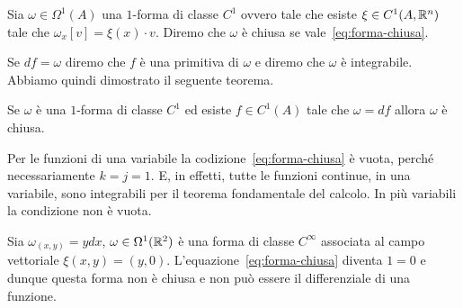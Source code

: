 \begin{definition}
Sia $\omega\in \Omega^1(A)$ una $1$-forma di classe $C^1$
ovvero tale che esiste $\xi\in C^1(A,{\mathbb R}^n)$ tale che 
$\omega_x[v] = \xi(x)\cdot v$. 
Diremo che $\omega$ è chiusa se vale~\eqref{eq:forma-chiusa}.
\end{definition}

Se $df = \omega$ diremo che $f$ è una primitiva di $\omega$ 
e diremo che $\omega$ è integrabile. 
Abbiamo quindi dimostrato il seguente teorema.

\begin{theorem}
\label{th:forma-chiusa}
Se $\omega$ è una $1$-forma di classe $C^1$ ed esiste 
$f\in C^1(A)$ tale che $\omega = df$ allora $\omega$ è chiusa. 
\end{theorem}

Per le funzioni di una variabile la codizione~\eqref{eq:forma-chiusa} è vuota, 
perché necessariamente $k=j=1$. 
E, in effetti, tutte le funzioni continue, in una variabile, sono integrabili 
per il teorema fondamentale del calcolo. 
In più variabili la condizione non è vuota. 

\begin{example}
Sia $\omega_{(x,y)} = y dx$, $\omega \in \Omega^1({\mathbb R}^2)$ è una forma di classe $C^\infty$ 
associata al campo vettoriale $\xi(x,y) = (y,0)$.
L'equazione~\eqref{eq:forma-chiusa} diventa $1=0$ e dunque questa forma non è chiusa e non 
può essere il differenziale di una funzione.
\end{example}

